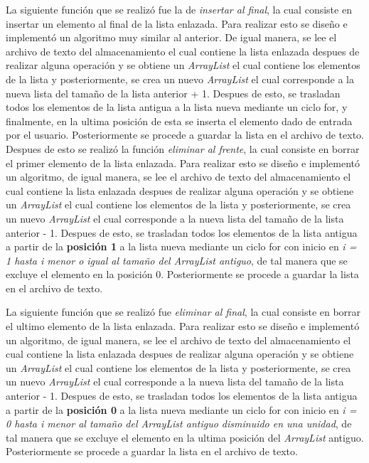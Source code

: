 \documentclass[conference]{IEEEtran}
\begin{document}
La siguiente función que se realizó fue la de \textit{insertar al final}, la cual consiste en insertar un elemento al final de la lista enlazada. Para realizar esto se diseño e implementó un algoritmo muy similar al anterior. De igual manera, se lee el archivo de texto del almacenamiento el cual contiene la lista enlazada despues de realizar alguna operación y se obtiene un \textit{ArrayList} el cual contiene los elementos de la lista y posteriormente, se crea un nuevo \textit{ArrayList} el cual corresponde a la nueva lista del tamaño de la lista anterior + 1. Despues de esto, se trasladan todos los elementos de la lista antigua a la lista nueva mediante un ciclo for, y finalmente, en la ultima posición de esta se inserta el elemento dado de entrada por el usuario. Posteriormente se procede a guardar la lista en el archivo de texto.\\

Despues de esto se realizó la función \textit{eliminar al frente}, la cual consiste en borrar el primer elemento de la lista enlazada. Para realizar esto se diseño e implementó un algoritmo, de igual manera, se lee el archivo de texto del almacenamiento el cual contiene la lista enlazada despues de realizar alguna operación y se obtiene un \textit{ArrayList} el cual contiene los elementos de la lista y posteriormente, se crea un nuevo \textit{ArrayList} el cual corresponde a la nueva lista del tamaño de la lista anterior - 1. Despues de esto, se trasladan todos los elementos de la lista antigua a partir de la \textbf{posición 1} a la lista nueva mediante un ciclo for con inicio en \textit{i = 1 hasta i menor o igual al tamaño del ArrayList antiguo}, de tal manera que se excluye el elemento en la posición 0. Posteriormente se procede a guardar la lista en el archivo de texto.

La siguiente función que se realizó fue \textit{eliminar al final}, la cual consiste en borrar el ultimo elemento de la lista enlazada. Para realizar esto se diseño e implementó un algoritmo, de igual manera, se lee el archivo de texto del almacenamiento el cual contiene la lista enlazada despues de realizar alguna operación y se obtiene un \textit{ArrayList} el cual contiene los elementos de la lista y posteriormente, se crea un nuevo \textit{ArrayList} el cual corresponde a la nueva lista del tamaño de la lista anterior - 1. Despues de esto, se trasladan todos los elementos de la lista antigua a partir de la \textbf{posición 0} a la lista nueva mediante un ciclo for con inicio en \textit{i = 0 hasta i menor al tamaño del ArrayList antiguo disminuido en una unidad}, de tal manera que se excluye el elemento en la ultima posición del \textit{ArrayList} antiguo. Posteriormente se procede a guardar la lista en el archivo de texto.
\end{document}
